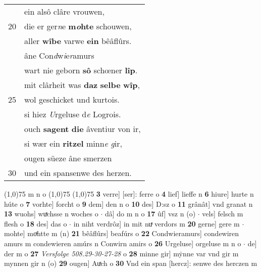 \documentclass[8pt,a4paper,notitlepage]{article}
\begin{document}
\begin{table}[ht]
\begin{minipage}[t]{0.5\linewidth}
\begin{tabular}{rl}
 & ein alsô clâre vrouwen,\\ 
20 & die er ger\textit{n}e \textbf{m\textit{o}hte} schouwen,\\ 
 & aller \textbf{wîbe} varwe \textbf{ein} bêâflûrs.\\ 
 & âne Con\textit{d}w\textit{i}e\textit{r}amurs\\ 
 & wart nie geborn \textbf{sô} schœner \textbf{lîp}.\\ 
 & mit clârheit was \textbf{daz} \textbf{selbe} \textbf{wîp},\\ 
25 & wol geschicket und kurtois.\\ 
 & si hiez \textit{U}rgeluse d\textit{e} Logrois.\\ 
 & ouch \textbf{sagent} \textbf{die} âventiur von ir,\\ 
 & si wær ein \textbf{ritzel} minn\textit{e} \textit{g}ir,\\ 
 & ougen süeze âne smerzen\\ 
30 & und ein spansenwe des herzen.\\ 
\end{tabular}
\scriptsize
\line(1,0){75} \newline
m n o \newline
\line(1,0){75} \newline
\newline
\line(1,0){75} \newline
\textbf{3} verre] [ser]: ferre o \textbf{4} lief] lieffe n \textbf{6} hiure] hurte n húte o \textbf{7} vorhte] forcht o \textbf{9} dem] den n o \textbf{10} des] D:sz o \textbf{11} grânât] vnd granat n \textbf{13} wuohs] wuͯchsse n woches o  $\cdot$ dâ] do m n o \textbf{17} ûf] vsz n (o)  $\cdot$ vels] felsch m flesh o \textbf{18} des] das o  $\cdot$ in niht verdrôz] in mit nuͯ verdors m \textbf{20} gerne] gere m  $\cdot$ mohte] moͯhtte m (n) \textbf{21} bêâflûrs] beafúrs o \textbf{22} Condwieramurs] condewiren amurs m condewieren amúrs n Conwirn amirs o \textbf{26} Urgeluse] orgeluse m n o  $\cdot$ de] der m o \textbf{27} \textit{Versfolge 508.29-30-27-28} o  \textbf{28} minne gir] mẏnne var vnd gir m mynnen gir n (o) \textbf{29} ougen] Auͯch o \textbf{30} Vnd ein span [hercz]: senwe des herczen m \newline
\end{minipage}
\end{table}
\newpage
\end{document}
